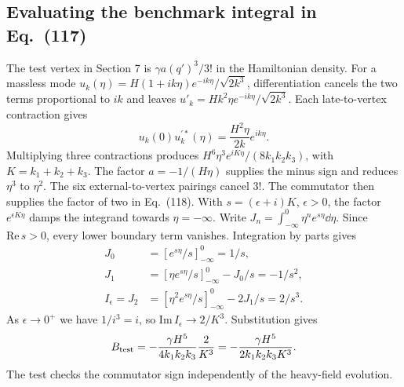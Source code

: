\subsection{Evaluating the benchmark integral in Eq.~(117)}
The test vertex in Section 7 is $\gamma a(q')^3/3!$ in the Hamiltonian density. For a massless mode $u_k(\eta)=H(1+ik\eta)e^{-ik\eta}/\sqrt{2k^3}$, differentiation cancels the two terms proportional to $ik$ and leaves $u'_k=H k^2\eta e^{-ik\eta}/\sqrt{2k^3}$. Each late-to-vertex contraction gives
\[
 u_k(0)u_k^{\prime *}(\eta)=\frac{H^2\eta}{2k}e^{ik\eta}.
\]
Multiplying three contractions produces $H^6\eta^3 e^{iK\eta}/(8k_1k_2k_3)$, with $K=k_1+k_2+k_3$. The factor $a=-1/(H\eta)$ supplies the minus sign and reduces $\eta^3$ to $\eta^2$. The six external-to-vertex pairings cancel $3!$. The commutator then supplies the factor of two in Eq.~(118).
\clearpage
With $s=(\epsilon+i)K$, $\epsilon>0$, the factor $e^{\epsilon K\eta}$ damps the integrand towards $\eta=-\infty$. Write $J_n=\int_{-\infty}^0\eta^n e^{s\eta}\dd\eta$. Since $\mathrm{Re}\,s>0$, every lower boundary term vanishes. Integration by parts gives
\begin{align}
J_0&=[e^{s\eta}/s]_{-\infty}^0=1/s,\nonumber\\
J_1&=[\eta e^{s\eta}/s]_{-\infty}^0-J_0/s=-1/s^2,\nonumber\\
I_\epsilon=J_2&=[\eta^2 e^{s\eta}/s]_{-\infty}^0-2J_1/s=2/s^3.
\end{align}
As $\epsilon\to0^+$ we have $1/i^3=i$, so $\mathrm{Im}\, I_\epsilon\to2/K^3$. Substitution gives
\[B_{\rm test}=-\frac{\gamma H^5}{4 k_1k_2k_3}\frac{2}{K^3}=-\frac{\gamma H^5}{2 k_1k_2k_3 K^3}.\] The test checks the commutator sign independently of the heavy-field evolution.

